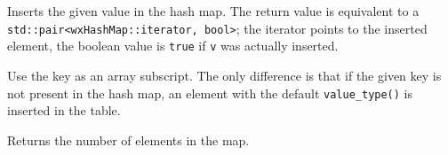 Inserts the given value in the hash map. The return value is
equivalent to a \texttt{std::pair<wxHashMap::iterator, bool>};
the iterator points to the inserted element, the boolean value
is \texttt{true} if \texttt{v} was actually inserted.

\label{wxhashmapbracket}


Use the key as an array subscript. The only difference is that if the
given key is not present in the hash map, an element with the
default {\tt value\_type()} is inserted in the table.

\label{wxhashmapsize}


Returns the number of elements in the map.


